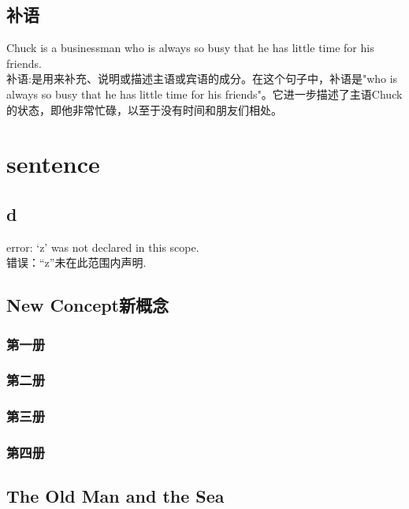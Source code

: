 \documentclass[12pt,twiside,a4paper]{ctexbook}
\numberwithin{chapter}{part}
\begin{document}
\section{补语}
Chuck is a businessman who is always so busy that he has little time for his friends. \\
补语:是用来补充、说明或描述主语或宾语的成分。在这个句子中，补语是"who is always so busy that he has little time for his friends"。它进一步描述了主语Chuck的状态，即他非常忙碌，以至于没有时间和朋友们相处。

\chapter{sentence}
\section{d}
error: ‘z’ was not declared in this scope.\\
错误：“z”未在此范围内声明.

\section{New Concept新概念}
\subsection{第一册}
\subsection{第二册}
\subsection{第三册}
\subsection{第四册}
\section{The Old Man and the Sea}
\end{document}
